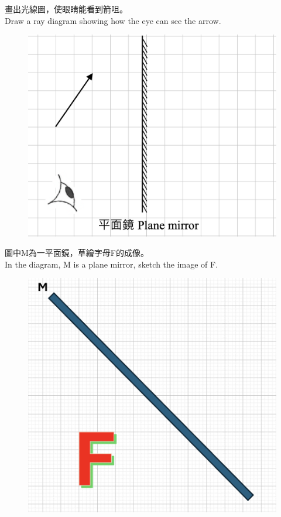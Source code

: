\documentclass[beamer=true]{standalone}
\begin{document}
\begin{eg}
    畫出光線圖，使眼睛能看到箭咀。\\Draw a ray diagram showing how the eye can see the arrow.
    \begin{figure}
        \centering
        \includegraphics[width=0.75\linewidth]{assets/ddjion18uu29.png}
        
        
    \end{figure}
\end{eg}

        
        


\begin{eg}
    圖中M為一平面鏡，草繪字母F的成像。\\In the diagram, M is a plane mirror, sketch the image of F.
   \begin{figure}
       \centering
       \includegraphics[width=0.5\linewidth]{assets/ddqdjioqwjdoi.png}
   \end{figure}
\end{eg}
\end{document}
